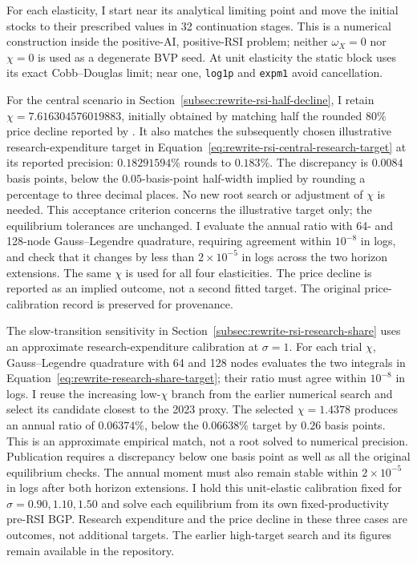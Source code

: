 For each elasticity, I start near its analytical limiting point and move
the initial stocks to their prescribed values in 32 continuation stages.
This is a numerical construction inside the positive-AI, positive-RSI
problem; neither $\omega_X=0$ nor $\chi=0$ is used as a degenerate BVP seed.
At unit elasticity the static block uses its exact Cobb--Douglas limit;
near one, \texttt{log1p} and \texttt{expm1} avoid cancellation.

For the central scenario in Section~\ref{subsec:rewrite-rsi-half-decline},
I retain $\chi=7.616304576019883$, initially obtained by matching half
the rounded $80\%$ price decline reported by \citet{oecdaimarkets2026}.
It also matches the subsequently chosen illustrative research-expenditure
target in Equation~\eqref{eq:rewrite-rsi-central-research-target} at its
reported precision: $0.18291594\%$ rounds to $0.183\%$. The discrepancy
is $0.0084$ basis points, below the $0.05$-basis-point half-width implied
by rounding a percentage to three decimal places. No new root search or
adjustment of $\chi$ is needed. This acceptance criterion concerns the
illustrative target only; the equilibrium tolerances are unchanged.
I evaluate the annual ratio with 64- and 128-node Gauss--Legendre
quadrature, requiring agreement within $10^{-8}$ in logs, and check that
it changes by less than $2\times10^{-5}$ in logs across the two horizon
extensions. The same $\chi$ is used for all four elasticities. The price
decline is reported as an implied outcome, not a second fitted target.
The original price-calibration record is preserved for provenance.

The slow-transition sensitivity in Section~\ref{subsec:rewrite-rsi-research-share} uses an approximate
research-expenditure calibration at $\sigma=1$. For each trial $\chi$,
Gauss--Legendre quadrature with 64 and 128 nodes evaluates the two integrals
in Equation~\eqref{eq:rewrite-research-share-target}; their ratio must agree
within $10^{-8}$ in logs. I reuse the increasing low-$\chi$ branch from the
earlier numerical search and select its candidate closest to the 2023
proxy. The selected $\chi=1.4378$ produces an annual ratio of $0.06374\%$,
below the $0.06638\%$ target by $0.26$ basis points. This is an approximate
empirical match, not a root solved to numerical precision. Publication
requires a discrepancy below one basis point as well as all the original
equilibrium checks. The annual moment must also remain stable within
$2\times10^{-5}$ in logs after both horizon extensions. I hold this
unit-elastic calibration fixed for $\sigma=0.90,1.10,1.50$ and solve each
equilibrium from its own fixed-productivity pre-RSI BGP. Research expenditure
and the price decline in these three cases are outcomes, not additional
targets. The earlier high-target search and its figures remain available
in the repository.

